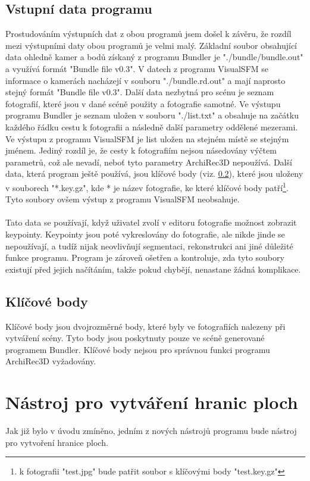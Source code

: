 \documentclass[11pt,twoside,a4paper]{book}
\begin{document}
\subsection{Vstupní data programu}
Prostudováním výstupních dat z obou programů jsem došel k závěru, že rozdíl mezi výstupními daty obou programů je velmi malý. Základní soubor obsahující data ohledně kamer a bodů získaný z programu Bundler je "./bundle/bundle.out" a využívá formát "Bundle file v0.3". V datech z programu VisualSFM se informace o kamerách nacházejí v souboru "./bundle.rd.out" a mají naprosto stejný formát "Bundle file v0.3". Další data nezbytná pro scénu je seznam fotografií, které jsou v dané scéně použity a fotografie samotné.  Ve výstupu programu Bundler je seznam uložen v souboru "./list.txt" a obsahuje na začátku každého řádku cestu k fotografii a následně další parametry oddělené mezerami. Ve výstupu z programu VisualSFM je list uložen na stejném místě se stejným jménem. Jediný rozdíl je, že cesty k fotografiím nejsou násedovány výčtem parametrů, což ale nevadí, neboť tyto parametry ArchiRec3D nepoužívá. Další data, která program ještě používá, jsou klíčové body (viz. \ref{keypoints}), které jsou uloženy v souborech "*.key.gz", kde * je název fotografie, ke které klíčové body patří\footnote{k fotografii "test.jpg" bude patřit soubor s klíčovými body "test.key.gz"}. Tyto soubory ovšem výstup z programu VisualSFM neobsahuje.
\paragraph{}
Tato data se používají, když uživatel zvolí v editoru fotografie možnost zobrazit keypointy. Keypointy jsou poté vykreslovány do fotografie, ale nikde jinde se nepoužívají, a tudíž nijak neovlivňují segmentaci, rekonstrukci ani jiné důležité funkce programu. Program je zároveň ošetřen a kontroluje, zda tyto soubory existují před jejich načítáním, takže pokud chybějí, nenastane žádná komplikace.

\subsection{Klíčové body}
\label{keypoints}
Klíčové body jsou dvojrozměrné body, které byly ve fotografiích nalezeny při vytváření scény. Tyto body jsou poskytnuty pouze ve scéně generované programem Bundler. Klíčové body nejsou pro správnou funkci programu ArchiRec3D vyžadovány.

\section{Nástroj pro vytváření hranic ploch}
Jak již bylo v úvodu zmíněno, jedním z nových nástrojů programu bude nástroj pro vytvoření hranice ploch. 
\end{document}
